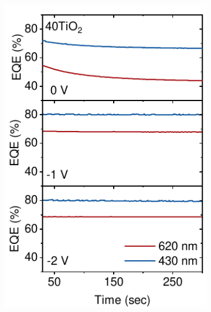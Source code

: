 \begin{figure}[htbp]
    \centering
    \begin{subfigure}{0.32\textwidth}
        \centering
        \includegraphics[width=\textwidth]{chapters/transport_layers/images/StaticEQE_40TiO2.pdf}
        \caption{}
        \label{}
    \end{subfigure}
    \hfill
    \begin{subfigure}{0.32\textwidth}
        \centering

\end{subfigure}
\end{figure}
